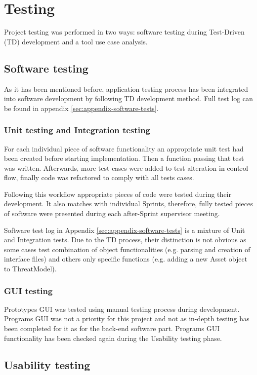 \section{Testing}\label{testing}
Project testing was performed in two ways: software testing during Test-Driven (TD) development and a tool use case analysis. 

\subsection{Software testing}
	As it has been mentioned before, application testing process has been integrated into software development by following TD development method. Full test log can be found in appendix \ref{sec:appendix-software-tests}.

	\subsubsection{Unit testing and Integration testing}
	For each individual piece of software functionality an appropriate unit test had been created before starting implementation. Then a function passing that test was written. Afterwards, more test cases were added to test alteration in control flow, finally code was refactored to comply with all tests cases.
	
	Following this workflow appropriate pieces of code were tested during their development. It also matches with individual Sprints, therefore, fully tested pieces of software were presented during each after-Sprint supervisor meeting.
	
	Software test log in Appendix \ref{sec:appendix-software-tests} is a mixture of Unit and Integration tests. Due to the TD process, their distinction is not obvious as some cases test combination of object functionalities (e.g. parsing and creation of interface files) and others only specific functions (e.g. adding a new Asset object to ThreatModel).


	\subsubsection{GUI testing}
	Prototypes GUI was tested using manual testing process during development. Programs GUI was not a priority for this project and not as in-depth testing has been completed for it as for the back-end software part. Programs GUI functionality has been checked again during the Usability testing phase.


\subsection{Usability testing}

